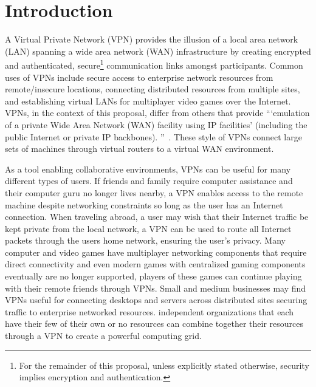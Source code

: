 \chapter{Introduction}
\label{introduction}
A Virtual Private Network (VPN) provides the illusion of a local area network
(LAN) spanning a wide area network (WAN) infrastructure by creating encrypted
and authenticated, secure\footnote{For the remainder of this proposal, unless
explicitly stated otherwise, security implies encryption and authentication.}
communication links amongst participants.  Common uses of VPNs include secure
access to enterprise network resources from remote/insecure locations,
connecting distributed resources from multiple sites, and establishing virtual
LANs for multiplayer video games over the Internet.  VPNs, in the context of
this proposal, differ from others that provide ```emulation of a private Wide
Area Network (WAN) facility using IP facilities' (including the public Internet
or private IP backbones).  ''~\cite{ip_vpns}.  These style of VPNs connect large
sets of machines through virtual routers to a virtual WAN environment.

As a tool enabling collaborative environments, VPNs can be useful for many
different types of users.  If friends and family require computer assistance
and their computer guru no longer lives nearby, a VPN enables access to the
remote machine despite networking constraints so long as the user has an
Internet connection.  When traveling abroad, a user may wish that their
Internet traffic be kept private from the local network, a VPN can be
used to route all Internet packets through the users home network, ensuring
the user's privacy.  Many computer and video games have multiplayer networking
components that require direct connectivity and even modern games with
centralized gaming components eventually are no longer supported, players of
these games can continue playing with their remote friends through VPNs.  Small
and medium businesses may find VPNs useful for connecting desktops and servers
across distributed sites securing traffic to enterprise networked resources.
independent organizations that each have their few of their own or no resources
can combine together their resources through a VPN to create a powerful
computing grid.


